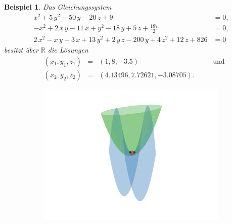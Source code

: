\documentclass[a4paper,oneside, 11pt, openany%
]{article}
\newcommand{\R}{{\mathbb R}}
\theoremstyle{custom}
\theoremstyle{custom}
\newtheorem{example}{Beispiel}[section]
\begin{document}
	\begin{example}
		Das Gleichungssystem
		\begin{equation*}\label{eqn:example3}
			\begin{alignedat}{-1}
				x^2+5\,y^2-50\,y-20\,z+9&=0,\\
				 -x^2+2\,x\,y-11\,x+y^2-18\,y+5\,z+\frac{187}{2}&=0,\\ 2\,x^2-x\,y-3\,x+13\,y^2+2\,y\,z-200\,y+4\,z^2+12\,z+826&=0
			\end{alignedat}
		\end{equation*}
		besitzt über $\R$ die Lösungen
		\begin{equation*}
			\begin{alignedat}{5}
				&\left( x_{1},y_{1},z_{1}\right) &=& \left(1,8,-3.5 \right)&& \quad\text{und} \\
				&\left( x_{2},y_{2},z_{2}\right) &=& \left(4.13496,7.72621,-3.08705 \right).&&
			\end{alignedat}
		\end{equation*}
		\begin{figure}[H]
			\centering
			\begin{subfigure}[b]{0.8\textwidth}
				\includegraphics[width=\textwidth]{"images/e3q3_example2.png"}
			\end{subfigure}
		\end{figure}
					\begin{figure}[H]\ContinuedFloat
			\begin{subfigure}[b]{0.8\textwidth}

\end{subfigure}
\end{figure}
\end{example}
\end{document}
